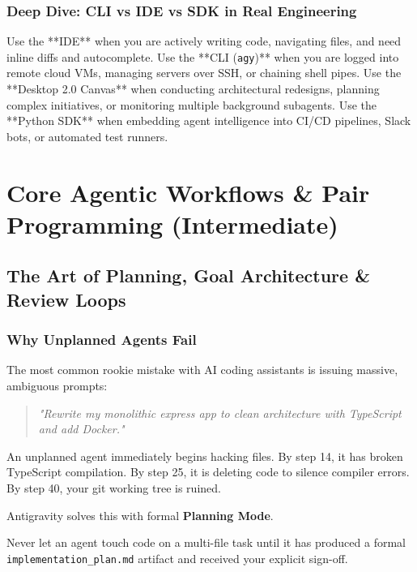 \documentclass[11pt,a4paper,oneside]{book}
\begin{document}
\section{Deep Dive: CLI vs IDE vs SDK in Real Engineering}
\begin{probox}
Use the **IDE** when you are actively writing code, navigating files, and need inline diffs and autocomplete. Use the **CLI (\texttt{agy})** when you are logged into remote cloud VMs, managing servers over SSH, or chaining shell pipes. Use the **Desktop 2.0 Canvas** when conducting architectural redesigns, planning complex initiatives, or monitoring multiple background subagents. Use the **Python SDK** when embedding agent intelligence into CI/CD pipelines, Slack bots, or automated test runners.
\end{probox}

\part{Core Agentic Workflows \& Pair Programming (Intermediate)}

\chapter{The Art of Planning, Goal Architecture \& Review Loops}

\section{Why Unplanned Agents Fail}
The most common rookie mistake with AI coding assistants is issuing massive, ambiguous prompts:
\begin{quote}
\textit{"Rewrite my monolithic express app to clean architecture with TypeScript and add Docker."}
\end{quote}
An unplanned agent immediately begins hacking files. By step 14, it has broken TypeScript compilation. By step 25, it is deleting code to silence compiler errors. By step 40, your git working tree is ruined.

Antigravity solves this with formal \textbf{Planning Mode}.

\begin{probox}
Never let an agent touch code on a multi-file task until it has produced a formal \texttt{implementation\_plan.md} artifact and received your explicit sign-off.
\end{probox}
\end{document}
